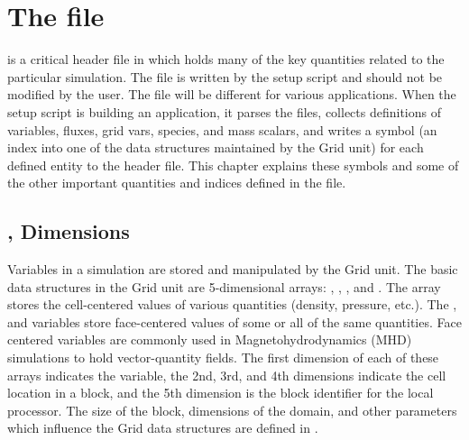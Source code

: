 \chapter{The  file}
\label{Chp:Flash.h}

is a critical header file in \flashx which
holds many of the key quantities related to the particular
simulation. The  file is written by the setup script
and should not be modified by the user.  
The  file will be different
for various applications.  When the setup script is building an
application, it parses the  files, collects definitions of
variables, fluxes, grid vars, species, and mass scalars, and writes 
a symbol (an index into one of the data structures maintained by
the \unit{Grid} unit)
for each defined entity to the  header file.
This chapter explains these symbols and some of the other 
important quantities and indices defined in the  file.


\newcommand{\htabopt}[1]{\multicolumn{2}{l}{\code{#1}}\\*[1ex]}
\newcommand{\htr}{\\[1ex]}


\section{,  Dimensions}
\label{Sec:FlashHdimensions}
Variables in a simulation are stored and manipulated by the
\unit{Grid} unit.  The basic data structures in the \unit{Grid} unit are
5-dimensional arrays: , , , and
.  The
array  stores the cell-centered values of various quantities
(density, pressure, etc.).  The ,  and
 variables store face-centered values of some or all of
the same quantities.  Face centered variables are commonly used in Magnetohydrodynamics (MHD)
simulations to hold vector-quantity fields.  The first dimension of
each of these arrays indicates the variable, the 2nd, 3rd, and 4th
dimensions indicate the cell location in a block, and the 5th dimension is
the block identifier for the local processor.  The size of the block,
dimensions of the domain, and other parameters which influence the
\unit{Grid} data structures are defined in .

